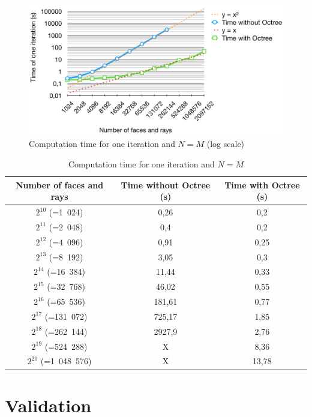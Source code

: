 \documentclass[AMA,STIX1COL]{WileyNJD-v2}
\begin{document}
\begin{figure}[h]
\centering
	\includegraphics[width=0.8\linewidth]{times}
	\caption{Computation time for one iteration and $N = M$ (log scale)}
	\label{times}
\end{figure}
%
\begin{table}[h]
\centering
	\begin{tabular}{| c | c | c |}
		\hline
		Number of faces and rays & Time \textbf{without} Octree (s) & Time \textbf{with} Octree (s)\\
		  \hline
		  \hline
		   $2^{10}$ (=1~024) & 0,26 &	0,2 \\
		   \hline
		$2^{11}$ (=2~048)  & 0,4	& 0,2 \\
		   \hline
		$2^{12}$ (=4~096) & 0,91	& 0,25\\
		   \hline
		$2^{13}$ (=8~192) & 3,05 &	0,3\\
		   \hline
		$2^{14}$ (=16~384) & 11,44	&0,33\\
		   \hline
		$2^{15}$ (=32~768) & 46,02	&0,55 \\
		     \hline
		    $2^{16}$ (=65~536) & 181,61	& 0,77\\
		   \hline
		$2^{17}$ (=131~072) & 725,17	& 1,85\\
		\hline
		$2^{18}$ (=262~144) & 2927,9 & 2,76 \\
		\hline
		$2^{19}$ (=524~288) & X & 8,36 \\
		\hline
		$2^{20}$ (=1~048~576) & X & 13,78 \\
		\hline
	 \end{tabular}
	\caption{Computation time for one iteration and $N = M$}
	\label{tabComplexite}
\end{table}


\newpage

\section{Validation}\label{sec5}
\end{document}
